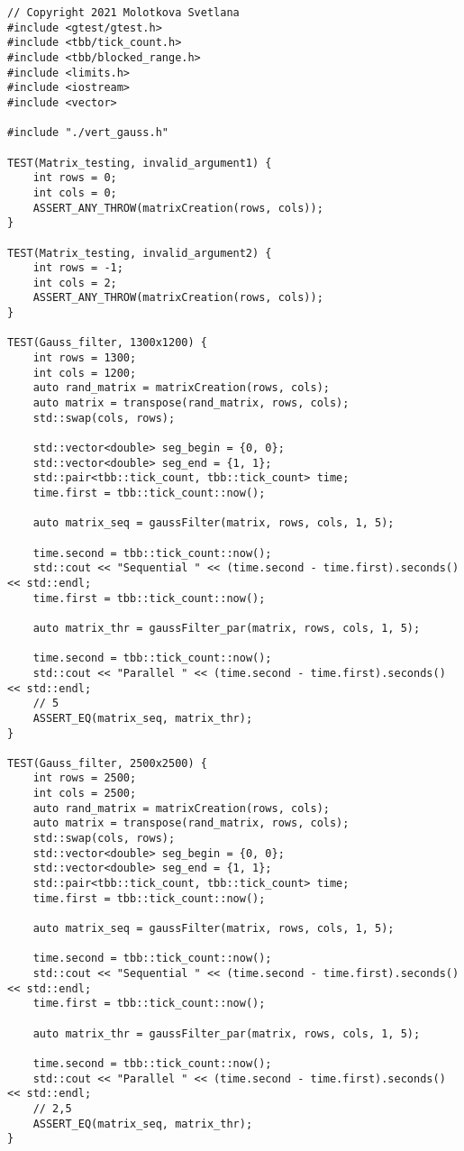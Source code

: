 \documentclass{report}
\begin{document}
\begin{lstlisting}
// Copyright 2021 Molotkova Svetlana
#include <gtest/gtest.h>
#include <tbb/tick_count.h>
#include <tbb/blocked_range.h>
#include <limits.h>
#include <iostream>
#include <vector>

#include "./vert_gauss.h"

TEST(Matrix_testing, invalid_argument1) {
	int rows = 0;
	int cols = 0;
	ASSERT_ANY_THROW(matrixCreation(rows, cols));
}

TEST(Matrix_testing, invalid_argument2) {
	int rows = -1;
	int cols = 2;
	ASSERT_ANY_THROW(matrixCreation(rows, cols));
}

TEST(Gauss_filter, 1300x1200) {
	int rows = 1300;
	int cols = 1200;
	auto rand_matrix = matrixCreation(rows, cols);
	auto matrix = transpose(rand_matrix, rows, cols);
	std::swap(cols, rows);
	
	std::vector<double> seg_begin = {0, 0};
	std::vector<double> seg_end = {1, 1};
	std::pair<tbb::tick_count, tbb::tick_count> time;
	time.first = tbb::tick_count::now();
	
	auto matrix_seq = gaussFilter(matrix, rows, cols, 1, 5);
	
	time.second = tbb::tick_count::now();
	std::cout << "Sequential " << (time.second - time.first).seconds() << std::endl;
	time.first = tbb::tick_count::now();
	
	auto matrix_thr = gaussFilter_par(matrix, rows, cols, 1, 5);
	
	time.second = tbb::tick_count::now();
	std::cout << "Parallel " << (time.second - time.first).seconds() << std::endl;
	// 5
	ASSERT_EQ(matrix_seq, matrix_thr);
}

TEST(Gauss_filter, 2500x2500) {
	int rows = 2500;
	int cols = 2500;
	auto rand_matrix = matrixCreation(rows, cols);
	auto matrix = transpose(rand_matrix, rows, cols);
	std::swap(cols, rows);
	std::vector<double> seg_begin = {0, 0};
	std::vector<double> seg_end = {1, 1};
	std::pair<tbb::tick_count, tbb::tick_count> time;
	time.first = tbb::tick_count::now();
	
	auto matrix_seq = gaussFilter(matrix, rows, cols, 1, 5);
	
	time.second = tbb::tick_count::now();
	std::cout << "Sequential " << (time.second - time.first).seconds() << std::endl;
	time.first = tbb::tick_count::now();
	
	auto matrix_thr = gaussFilter_par(matrix, rows, cols, 1, 5);
	
	time.second = tbb::tick_count::now();
	std::cout << "Parallel " << (time.second - time.first).seconds() << std::endl;
	// 2,5
	ASSERT_EQ(matrix_seq, matrix_thr);
}


\end{lstlisting}
\end{document}
